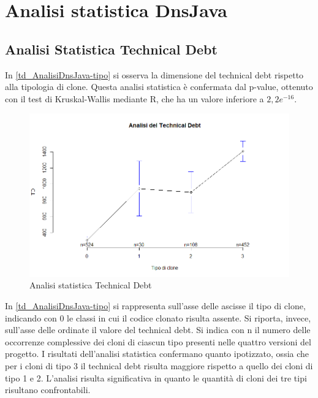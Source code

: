 \newpage
\section{Analisi statistica DnsJava}

\subsection{Analisi Statistica Technical Debt}
In \autoref{td_AnalisiDnsJava-tipo} si osserva la dimensione del technical debt rispetto alla tipologia di clone. Questa analisi statistica è confermata dal p-value, ottenuto con il test di Kruskal-Wallis mediante R, che ha un valore inferiore a $2,2 e^{-16}$.
\begin{figure}[htbp]
	\centering
	\includegraphics[scale=0.5]{analisi_R/AnalisiDnsJava/1-gplot-td-type.png}
\caption{Analisi statistica Technical Debt}
\label{td_AnalisiDnsJava-tipo}
\end{figure}

In \autoref{td_AnalisiDnsJava-tipo} si rappresenta sull'asse delle ascisse il tipo di clone, indicando con 0 le classi in cui il codice clonato risulta assente. Si riporta, invece, sull'asse delle ordinate il valore del technical debt. Si indica con n il numero delle occorrenze complessive dei cloni di ciascun tipo presenti nelle quattro versioni del progetto. I risultati dell'analisi statistica confermano quanto ipotizzato, ossia che per i cloni di tipo 3 il technical debt risulta maggiore rispetto a quello dei cloni di tipo 1 e 2. L'analisi risulta significativa in quanto le quantità di cloni dei tre tipi risultano confrontabili.
